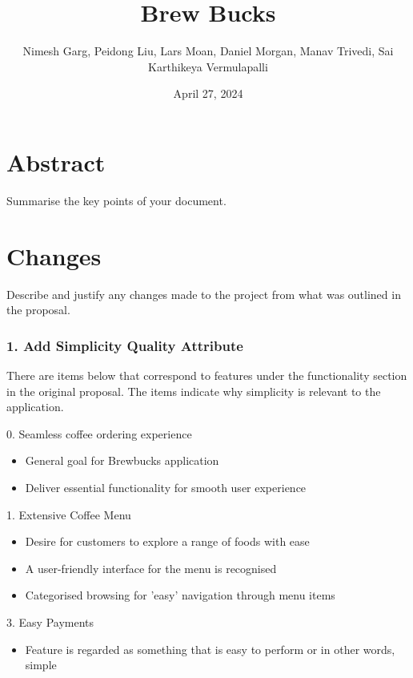 \documentclass{article}
\title{Brew Bucks}
\author{Nimesh Garg, Peidong Liu, Lars Moan, Daniel Morgan, Manav Trivedi, Sai Karthikeya Vermulapalli}
\date{April 27, 2024}
\begin{document}
\maketitle
\pagebreak

\tableofcontents
\pagebreak

\section{Abstract}
Summarise the key points of your document.
\section{Changes}
Describe and justify any changes made to the project from what was outlined in the proposal.

\subsubsection*{1. Add Simplicity Quality Attribute}
There are items below that correspond to features under the functionality section in the original proposal. The items indicate why simplicity is relevant to the application.

\medskip \begin{minipage}{\dimexpr\textwidth-0.25cm}
0. Seamless coffee ordering experience
\begin{itemize}
    \item General goal for Brewbucks application
    \item Deliver essential functionality for smooth user experience
\end{itemize}

1. Extensive Coffee Menu 
\begin{itemize}
    \item Desire for customers to explore a range of foods with ease
    \item A user-friendly interface for the menu is recognised
    \item Categorised browsing for 'easy' navigation through menu items
\end{itemize}

3. Easy Payments
\begin{itemize}
    \item Feature is regarded as something that is easy to perform or in other words, simple
\end{itemize}
\end{minipage}
\end{document}
